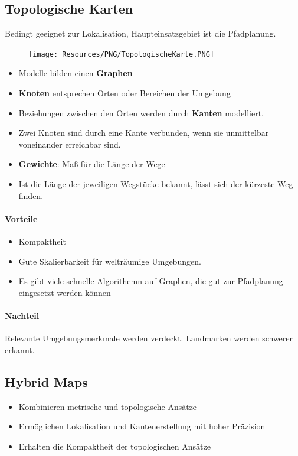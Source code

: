 \subsection{Topologische Karten}
Bedingt geeignet zur Lokalisation, Haupteinsatzgebiet ist die Pfadplanung.
\begin{figure}[H]
	\begin{center}
		\texttt{[image: Resources/PNG/TopologischeKarte.PNG]}
		\caption{}
		\label{fig:PNG/TopologischeKarte.PNG}
	\end{center}
\end{figure}
\begin{itemize}
	\item Modelle bilden einen \textbf{Graphen}
	\item \textbf{Knoten} entsprechen Orten oder Bereichen der Umgebung
	\item Beziehungen zwischen den Orten werden durch \textbf{Kanten} modelliert.
	\item Zwei Knoten sind durch eine Kante verbunden, wenn sie unmittelbar
		voneinander erreichbar sind.
	\item \textbf{Gewichte}: Maß für die Länge der Wege
	\item Ist die Länge der jeweiligen Wegstücke bekannt, lässt sich der
		kürzeste Weg finden.
\end{itemize}

\paragraph{Vorteile}
\begin{itemize}
	\item Kompaktheit
	\item Gute Skalierbarkeit für welträumige Umgebungen.
	\item Es gibt viele schnelle Algorithemn auf Graphen, die gut zur
		Pfadplanung eingesetzt werden können
\end{itemize}

\paragraph{Nachteil} Relevante Umgebungsmerkmale werden verdeckt. Landmarken
werden schwerer erkannt.

\subsection{Hybrid Maps}
\begin{itemize}
	\item Kombinieren metrische und topologische Ansätze
	\item Ermöglichen Lokalisation und Kantenerstellung mit hoher Präzision
	\item Erhalten die Kompaktheit der topologischen Ansätze
\end{itemize}

